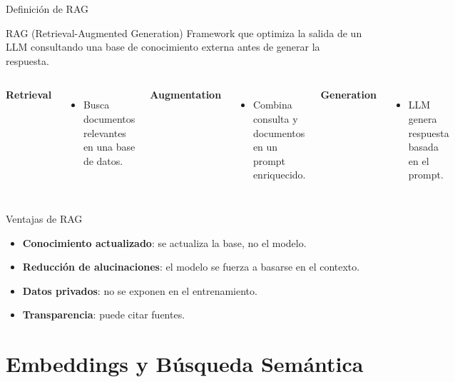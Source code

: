 \documentclass[aspectratio=169, 10pt, xcolor=table]{beamer}
\begin{document}
\begin{frame}{Definici\'on de RAG}
    \begin{block}{RAG (Retrieval-Augmented Generation)}
        Framework que optimiza la salida de un LLM consultando una base de conocimiento externa antes de generar la respuesta.
    \end{block}
    \begin{columns}[t]
        \textbf{Retrieval}
        \begin{itemize}
            \item Busca documentos relevantes en una base de datos.
        \end{itemize}
        \textbf{Augmentation}
        \begin{itemize}
            \item Combina consulta y documentos en un prompt enriquecido.
        \end{itemize}
        \textbf{Generation}
        \begin{itemize}
            \item LLM genera respuesta basada en el prompt.
        \end{itemize}
    \end{columns}
\end{frame}

\begin{frame}{Ventajas de RAG}
    \begin{itemize}
        \item \textbf{Conocimiento actualizado}: se actualiza la base, no el modelo.
        \item \textbf{Reducci\'on de alucinaciones}: el modelo se fuerza a basarse en el contexto.
        \item \textbf{Datos privados}: no se exponen en el entrenamiento.
        \item \textbf{Transparencia}: puede citar fuentes.
    \end{itemize}
\end{frame}

\section{Embeddings y B\'usqueda Sem\'antica}
\end{document}
